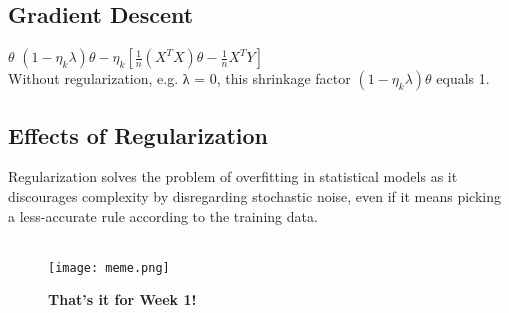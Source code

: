 \documentclass[a4paper]{article}
\begin{document}
\subsection{Gradient Descent}
$\theta$ \leftarrow $(1 - \eta_{k}\lambda)\theta - \eta_{k}[\frac{1}{n}(X^T X)\theta - \frac{1}{n}X^T Y]$\\
Without regularization, e.g. λ = 0, this shrinkage factor $(1 - \eta_{k}\lambda)\theta$ equals 1.

\subsection{Effects of Regularization}
Regularization solves the problem of overfitting in statistical models as it discourages complexity by disregarding stochastic noise, even if it means picking a less-accurate rule according to the training data. \\ \\
\begin{figure}[h]
    \centering
\texttt{[image: meme.png]}\\
\begin{Large} \textbf{That's it for Week 1!}\end{Large}
\end{figure}
\end{document}

